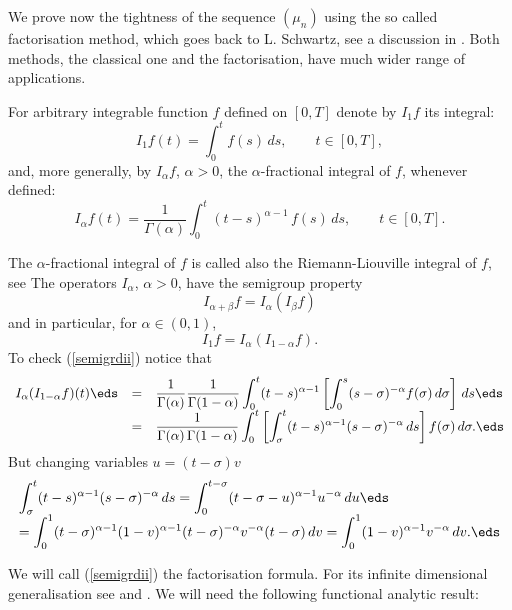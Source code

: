 \documentclass[preprint]{imsart}
\def\ds{\displaystyle}
\begin{document}
{We prove now the tightness of the sequence $(\mu_n)$
using the so called factorisation method, which goes back to L. Schwartz, see a discussion in \cite{factorization}. Both methods,
the classical one and the factorisation, have much
wider range of applications.

For arbitrary integrable function $f$ defined on
$[0,T]$ denote by $I_1f$ its integral:
\begin{equation}\label{defi1}
I_1f(t)= \int_0^tf(s)\, ds,\qquad t\in [0,T],
\end{equation}
and, more generally, by $I_\alpha f$, $\alpha >0$, the
$\alpha$-fractional integral of $f$,
whenever defined:
\begin{equation}\label{defi2}
I_\alpha f(t)=\frac{1}{\Gamma(\alpha)}
\int_0^t (t-s)^{\alpha -1}\, f(s)\,
ds,\qquad t\in [0,T].
\end{equation}

The $\alpha$-fractional integral of $f$ is called also
the Riemann-Liouville integral of $f$, see \cite{oldham}
The operators $I_\alpha $, $\alpha >0$, have the
semigroup property
$$
I_{\alpha +\beta}f = I_\alpha (I_\beta f)
$$
and in particular, for $\alpha\in (0,1)$,
\begin{equation}\label{semigrdii}
I_1 f= I_\alpha (I_{1-\alpha } f).
\end{equation}
To check (\ref{semigrdii}) notice that
$$
  \begin{array}{lll}
    \ds I_\alpha (I_{1-\alpha } f)(t)\eds & =&
    \ds
\frac{1}{\Gamma(\alpha)}\frac{1}{\Gamma (1-\alpha)}
\int_0^t(t-s)^{\alpha -1} \left[
\int_0^s(s-\sigma)^{-\alpha}f(\sigma)\, d\sigma
\right]\,ds
    \eds \\
    &= & \ds
\frac{1}{\Gamma(\alpha) \,\Gamma (1-\alpha)}
\int_0^t \left[
\int_\sigma^t
(t-s)^{\alpha -1}(s-\sigma)^{-\alpha}\,ds
\right] f(\sigma)\, d\sigma .
\eds
  \end{array}
$$
But changing variables $u=(t-\sigma)v$
$$
  \begin{array}{l}
    \ds
\int_\sigma^t
(t-s)^{\alpha -1}(s-\sigma)^{-\alpha}\,ds
=
\int_0^{t-\sigma}
(t-\sigma -u)^{\alpha -1}u^{-\alpha}\,du
    \eds \\
    \ds
=\int_0^1
(t-\sigma)^{\alpha -1} (1-v)^{\alpha
-1}(t-\sigma)^{-\alpha}v^{-\alpha}(t-\sigma)\,dv
= \int_0^1
 (1-v)^{\alpha -1} v^{-\alpha} \,dv.
\eds
  \end{array}
$$

 We will call (\ref{semigrdii}) the factorisation
formula. For its infinite dimensional generalisation see \cite{DZ1} and \cite{DZ2}. We will need the following functional analytic
result:

}
\end{document}
